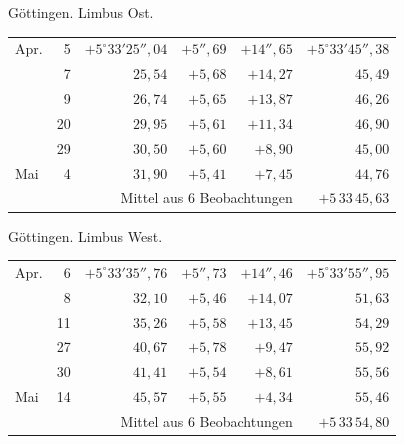 \noindent\begin{minipage}[t]{.495\textwidth}\centering Göttingen. Limbus Ost.\par\smallskip
{\scriptsize\setlength{\tabcolsep}{1pt}\renewcommand{\arraystretch}{1.2}\begin{tabular}{lr|r|r|r|r|}
Apr.&5&$+5^\circ33'25''{,}04$&$+5''{,}69$&$+14''{,}65$&$+5^\circ33'45''{,}38$\\
&7&$25{,}54$&$+5{,}68$&$+14{,}27$&$45{,}49$\\
&9&$26{,}74$&$+5{,}65$&$+13{,}87$&$46{,}26$\\
&20&$29{,}95$&$+5{,}61$&$+11{,}34$&$46{,}90$\\
&29&$30{,}50$&$+5{,}60$&$+8{,}90$&$45{,}00$\\
Mai&4&$31{,}90$&$+5{,}41$&$+7{,}45$&$44{,}76$\\
\cline{6-6}\multicolumn{5}{r}{Mittel aus 6 Beobachtungen}&$+5\,33\,45{,}63$
\end{tabular}}\end{minipage}\hfill\begin{minipage}[t]{.495\textwidth}\centering Göttingen. Limbus West.\par\smallskip
{\scriptsize\setlength{\tabcolsep}{1pt}\renewcommand{\arraystretch}{1.2}\begin{tabular}{lr|r|r|r|r}
Apr.&6&$+5^\circ33'35''{,}76$&$+5''{,}73$&$+14''{,}46$&$+5^\circ33'55''{,}95$\\
&8&$32{,}10$&$+5{,}46$&$+14{,}07$&$51{,}63$\\
&11&$35{,}26$&$+5{,}58$&$+13{,}45$&$54{,}29$\\
&27&$40{,}67$&$+5{,}78$&$+9{,}47$&$55{,}92$\\
&30&$41{,}41$&$+5{,}54$&$+8{,}61$&$55{,}56$\\
Mai&14&$45{,}57$&$+5{,}55$&$+4{,}34$&$55{,}46$\\
\cline{6-6}\multicolumn{5}{r}{Mittel aus 6 Beobachtungen}&$+5\,33\,54{,}80$
\end{tabular}}\end{minipage}
\par\vspace{4mm}

